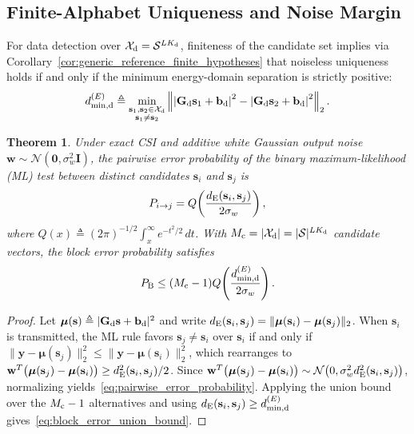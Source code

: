 \documentclass[journal]{IEEEtran}
\newtheorem{theorem}{Theorem}
\begin{document}
\subsection{Finite-Alphabet Uniqueness and Noise Margin}

For data detection over $\mathcal{X}_{\rm d} = \mathcal{S}^{LK_{\rm d}}$, finiteness of the candidate set implies via Corollary~\ref{cor:generic_reference_finite_hypotheses} that noiseless uniqueness holds if and only if the minimum energy-domain separation is strictly positive:
\begin{equation}
d_{\min,{\rm d}}^{(E)}
\triangleq
\min_{\substack{\mathbf{s}_1,\mathbf{s}_2\in\mathcal{X}_{\rm d}\\
\mathbf{s}_1\ne\mathbf{s}_2}}
\left\|
\left|\mathbf{G}_{\rm d}\mathbf{s}_1+\mathbf{b}_{\rm d}\right|^{2}
-
\left|\mathbf{G}_{\rm d}\mathbf{s}_2+\mathbf{b}_{\rm d}\right|^{2}
\right\|_{2}.
\label{eq:data_energy_domain_min_distance}
\end{equation}

\begin{theorem}
\label{thm:discrete_stability}
Under exact CSI and additive white Gaussian output noise $\mathbf{w}\sim\mathcal{N}(\mathbf{0},\sigma_w^2\mathbf{I})$, the pairwise error probability of the binary maximum-likelihood (ML) test between distinct candidates $\mathbf{s}_i$ and $\mathbf{s}_j$ is
\begin{equation}
P_{i\to j}
= Q\!\left(\frac{d_{\rm E}(\mathbf{s}_i,\mathbf{s}_j)}{2\sigma_w}\right),
\label{eq:pairwise_error_probability}
\end{equation}
where $Q(x)\triangleq(2\pi)^{-1/2}\int_x^\infty e^{-t^2/2}\,dt$. With $M_{\rm c} = |\mathcal{X}_{\rm d}| = |\mathcal{S}|^{LK_{\rm d}}$ candidate vectors, the block error probability satisfies
\begin{equation}
P_{\rm B}
\le (M_{\rm c}-1)
Q\!\left(\frac{d_{\min,{\rm d}}^{(E)}}{2\sigma_w}\right).
\label{eq:block_error_union_bound}
\end{equation}
\end{theorem}

\begin{proof}
Let $\boldsymbol{\mu}(\mathbf{s}) \triangleq |\mathbf{G}_{\rm d}\mathbf{s}+\mathbf{b}_{\rm d}|^{2}$ and write $d_{\rm E}(\mathbf{s}_i,\mathbf{s}_j) = \|\boldsymbol{\mu}(\mathbf{s}_i)-\boldsymbol{\mu}(\mathbf{s}_j)\|_{2}$. When $\mathbf{s}_i$ is transmitted, the ML rule favors $\mathbf{s}_j \neq \mathbf{s}_i$ over $\mathbf{s}_i$ if and only if $\|\mathbf{y}-\boldsymbol{\mu}(\mathbf{s}_j)\|_{2}^{2} \le \|\mathbf{y}-\boldsymbol{\mu}(\mathbf{s}_i)\|_{2}^{2}$, which rearranges to $\mathbf{w}^{T}\bigl(\boldsymbol{\mu}(\mathbf{s}_j)-\boldsymbol{\mu}(\mathbf{s}_i)\bigr) \ge d_{\rm E}^{2}(\mathbf{s}_i,\mathbf{s}_j)/2$. Since $\mathbf{w}^{T}\bigl(\boldsymbol{\mu}(\mathbf{s}_j)-\boldsymbol{\mu}(\mathbf{s}_i)\bigr) \sim \mathcal{N}\bigl(0, \sigma_w^2 d_{\rm E}^2(\mathbf{s}_i,\mathbf{s}_j)\bigr)$, normalizing yields~\eqref{eq:pairwise_error_probability}. Applying the union bound over the $M_{\rm c}-1$ alternatives and using $d_{\rm E}(\mathbf{s}_i,\mathbf{s}_j) \ge d_{\min,{\rm d}}^{(E)}$ gives~\eqref{eq:block_error_union_bound}.
\end{proof}
\end{document}
